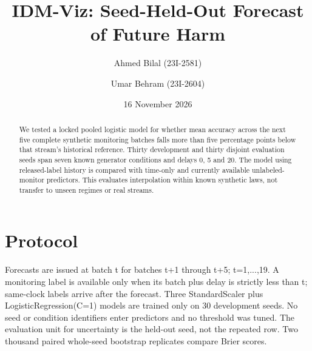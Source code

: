 \documentclass[10pt,a4paper]{article}
\title{IDM-Viz: Seed-Held-Out Forecast of Future Harm}
\author{Ahmed Bilal (23I-2581) \and Umar Behram (23I-2604)}\date{16 November 2026}
\begin{document}
\maketitle
\begin{abstract}
We tested a locked pooled logistic model for whether mean accuracy across the next five complete synthetic monitoring batches falls more than five percentage points below that stream's historical reference. Thirty development and thirty disjoint evaluation seeds span seven known generator conditions and delays 0, 5 and 20. The model using released-label history is compared with time-only and currently available unlabeled-monitor predictors. This evaluates interpolation within known synthetic laws, not transfer to unseen regimes or real streams.
\end{abstract}
\section{Protocol}
Forecasts are issued at batch t for batches t+1 through t+5; t=1,...,19. A monitoring label is available only when its batch plus delay is strictly less than t; same-clock labels arrive after the forecast. Three StandardScaler plus LogisticRegression(C=1) models are trained only on 30 development seeds. No seed or condition identifiers enter predictors and no threshold was tuned. The evaluation unit for uncertainty is the held-out seed, not the repeated row. Two thousand paired whole-seed bootstrap replicates compare Brier scores.
\end{document}
